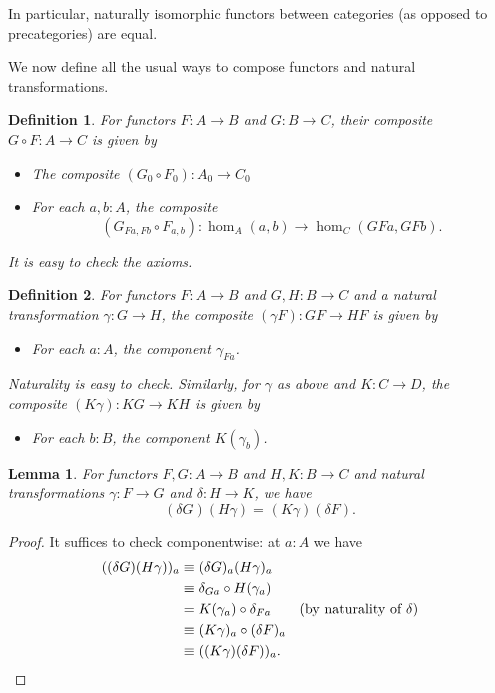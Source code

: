\documentclass[12pt]{article}
\newcommand{\id}[3][]{\ensuremath{#2 =_{#1} #3}\xspace}
\newcommand{\jdeq}{\equiv}
\newcommand{\mentalpause}{\medskip}
\newcounter{mathcount}
\newtheorem{predefn}{Definition}
\newenvironment{defn}{\begin{predefn}}{\end{predefn}\addtocounter{mathcount}{1}}
\newtheorem{prelem}{Lemma}
\newenvironment{lem}{\begin{prelem}}{\end{prelem}\addtocounter{mathcount}{1}}
\begin{document}
In particular, naturally isomorphic functors between categories (as opposed to precategories) are equal.

\mentalpause

We now define all the usual ways to compose functors and natural transformations.

\begin{defn}
  For functors $F:A\to B$ and $G:B\to C$, their composite $G\circ F:A\to C$ is given by
  \begin{itemize}
  \item The composite $(G_0\circ F_0) : A_0 \to C_0$
  \item For each $a,b:A$, the composite
    \[(G_{Fa,Fb}\circ F_{a,b}):\hom_A(a,b) \to \hom_C(GFa,GFb).\]
  \end{itemize}
  It is easy to check the axioms.
\end{defn}

\begin{defn}
  For functors $F:A\to B$ and $G,H:B\to C$ and a natural transformation $\gamma:G\to H$, the composite $(\gamma F):GF\to HF$ is given by
  \begin{itemize}
  \item For each $a:A$, the component $\gamma_{Fa}$.
  \end{itemize}
  Naturality is easy to check.
  Similarly, for $\gamma$ as above and $K:C\to D$, the composite $(K\gamma):KG\to KH$ is given by
  \begin{itemize}
  \item For each $b:B$, the component $K(\gamma_b)$.
  \end{itemize}
\end{defn}

\begin{lem}\label{ct:interchange}
  For functors $F,G:A\to B$ and $H,K:B\to C$ and natural transformations $\gamma:F\to G$ and $\delta:H\to K$, we have
  \[\id{(\delta G)(H\gamma)}{(K\gamma)(\delta F)}.\]
\end{lem}
\begin{proof}
  It suffices to check componentwise: at $a:A$ we have
  \begin{align*}
    ((\delta G)(H\gamma))_a
    &\jdeq (\delta G)_{a}(H\gamma)_a\\
    &\jdeq \delta_{Ga}\circ H(\gamma_a)\\
    &= K(\gamma_a) \circ \delta_{Fa} \tag{by naturality of $\delta$}\\
    &\jdeq (K \gamma)_a\circ (\delta F)_a\\
    &\jdeq ((K \gamma)(\delta F))_a.\qedhere
  \end{align*}
\end{proof}
\end{document}
